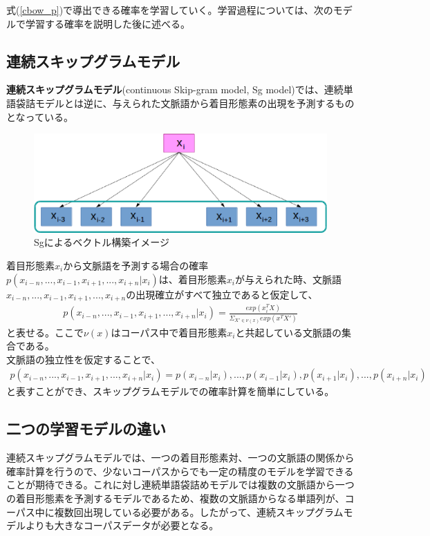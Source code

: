 式(\ref{cbow_p})で導出できる確率を学習していく。学習過程については、次のモデルで学習する確率を説明した後に述べる。

\subsection{連続スキップグラムモデル}
\textbf{連続スキップグラムモデル}(continuous Skip-gram model, Sg model)では、連続単語袋詰モデルとは逆に、与えられた文脈語から着目形態素の出現を予測するものとなっている。
\begin{figure}[h]
  \centering
  \includegraphics[width=12.5cm]{../images/Sg.eps}
  \caption{Sgによるベクトル構築イメージ}
\end{figure}

着目形態素$x_i$から文脈語を予測する場合の確率$p(x_{i-n},...,x_{i-1},x_{i+1},...,x_{i+n}|x_i)$は、着目形態素$x_i$が与えられた時、文脈語$x_{i-n},...,x_{i-1},x_{i+1},...,x_{i+n}$の出現確立がすべて独立であると仮定して、
\begin{eqnarray}
  \label{cskip_p}
  p(x_{i-n},...,x_{i-1},x_{i+1},...,x_{i+n}|x_i) = \frac{exp(x_i^TX)}{\Sigma_{X'\in\nu(x)}exp(x^TX')}
\end{eqnarray}
と表せる。ここで$\nu(x)$はコーパス中で着目形態素$x_i$と共起している文脈語の集合である。\\
文脈語の独立性を仮定することで、
\begin{eqnarray}
  p(x_{i-n},...,x_{i-1},x_{i+1},...,x_{i+n}|x_i) = p(x_{i-n}|x_i),...,p(x_{i-1}|x_i),p(x_{i+1}|x_i),...,p(x_{i+n}|x_i) \nonumber
\end{eqnarray}
と表すことができ、スキップグラムモデルでの確率計算を簡単にしている。

\subsection{二つの学習モデルの違い}
連続スキップグラムモデルでは、一つの着目形態素対、一つの文脈語の関係から確率計算を行うので、少ないコーパスからでも一定の精度のモデルを学習できることが期待できる。これに対し連続単語袋詰めモデルでは複数の文脈語から一つの着目形態素を予測するモデルであるため、複数の文脈語からなる単語列が、コーパス中に複数回出現している必要がある。したがって、連続スキップグラムモデルよりも大きなコーパスデータが必要となる。\cite{book_wm}

